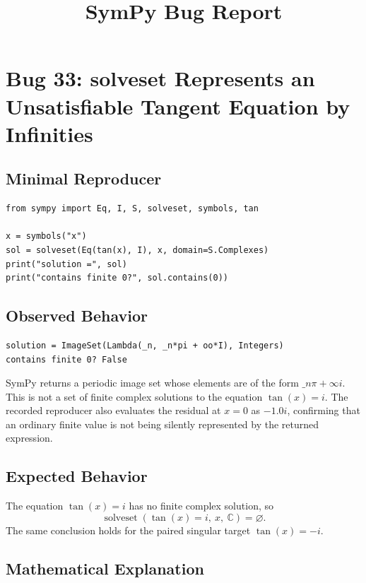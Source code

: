 \documentclass[11pt]{article}
\title{SymPy Bug Report}
\author{}
\date{}
\begin{document}
\maketitle

\section{Bug 33: solveset Represents an Unsatisfiable Tangent Equation by Infinities}

\subsection{Minimal Reproducer}

\medskip

\begin{lstlisting}[style=bugpython]
from sympy import Eq, I, S, solveset, symbols, tan

x = symbols("x")
sol = solveset(Eq(tan(x), I), x, domain=S.Complexes)
print("solution =", sol)
print("contains finite 0?", sol.contains(0))
\end{lstlisting}

\subsection{Observed Behavior}

\medskip

\begin{lstlisting}[style=bugpython]
solution = ImageSet(Lambda(_n, _n*pi + oo*I), Integers)
contains finite 0? False
\end{lstlisting}

SymPy returns a periodic image set whose elements are of the form
\(\_n\pi+\infty i\). This is not a set of finite complex solutions to the
equation \(\tan(x)=i\). The recorded reproducer also evaluates the residual at
\(x=0\) as \(-1.0 i\), confirming that an ordinary finite value is not being
silently represented by the returned expression.

\subsection{Expected Behavior}

The equation \(\tan(x)=i\) has no finite complex solution, so
\[
\operatorname{solveset}(\tan(x)=i,\ x,\ \mathbb{C}) = \varnothing.
\]
The same conclusion holds for the paired singular target \(\tan(x)=-i\).

\subsection{Mathematical Explanation}
\end{document}

